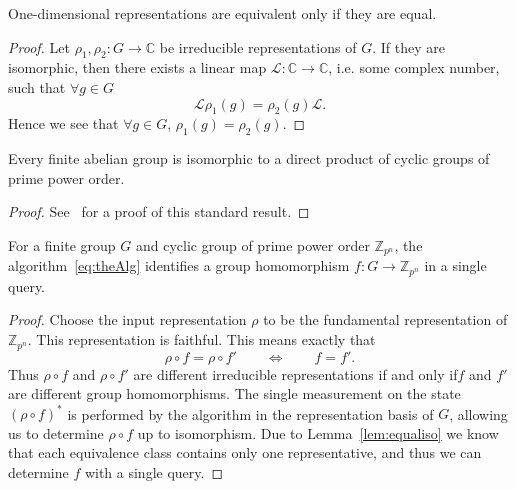 \begin{lemma}
\label{lem:equaliso}
One-dimensional representations are equivalent only if they are equal.
\end{lemma}
\begin{proof}
Let $\rho_1,\rho_2:G\to \mathbb{C}$ be irreducible representations of $G$. If they are isomorphic, then there exists a linear map $\mathcal{L}:\mathbb{C}\to\mathbb{C}$, i.e. some complex number, such that $\forall g\in G$
$$\mathcal{L}\rho_1(g) = \rho_2(g)\mathcal{L}.$$
Hence we see that $\forall g\in G$, $\rho_1(g) = \rho_2(g)$.
\end{proof}

\begin{theorem}
\label{thm:structure}
Every finite abelian group is isomorphic to a direct product of cyclic groups of prime power order.
\end{theorem}
\begin{proof}
See~\cite[Theorem 6.4]{artin-algebra} for a proof of this standard result.
\end{proof}

\begin{theorem}\label{rightCyclic}
For a finite group $G$ and cyclic group of prime power order $\mathbb{Z}_{p^n}$, the algorithm~\eqref{eq:theAlg} identifies a group homomorphism $f:G\to \mathbb{Z}_{p^n}$ in a single query.
\end{theorem}
\begin{proof}
Choose the input representation $\rho$ to be the fundamental representation of $\mathbb{Z}_{p^n}$. This representation is faithful.  This means exactly that 
\[ \rho\circ f = \rho\circ f' \qquad \Leftrightarrow \qquad f=f'. \]
Thus $\rho\circ f$ and $\rho\circ f'$ are different irreducible representations if and only if$f$ and $f'$ are different group homomorphisms.  The single measurement on the state $(\rho\circ f)^*$ is performed by the algorithm in the representation basis of $G$, allowing us to determine $\rho\circ f$ up to isomorphism. Due to Lemma~\ref{lem:equaliso} we know that each equivalence class contains only one representative, and thus we can determine $f$ with a single query.
\end{proof}

